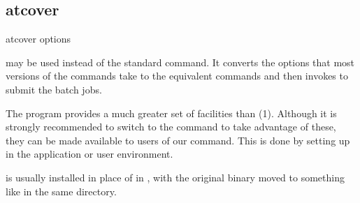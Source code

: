 \subsection{atcover}

\begin{expara}

atcover options

\end{expara}

 may be used instead of the standard  command. It converts the options that most versions of the
 commands take to the equivalent \PrBtr{} commands and then invokes \PrBtr{} to submit the batch jobs.

The \PrBtr{} program provides a much greater set of facilities than (1). Although it is strongly
recommended to switch to the \PrBtr{} command to take advantage of these, they can be made available to users of our
 command. This is done by setting up  in the application or user environment.

 is usually installed in place of  in , with the
original binary moved to something like  in the same directory.

